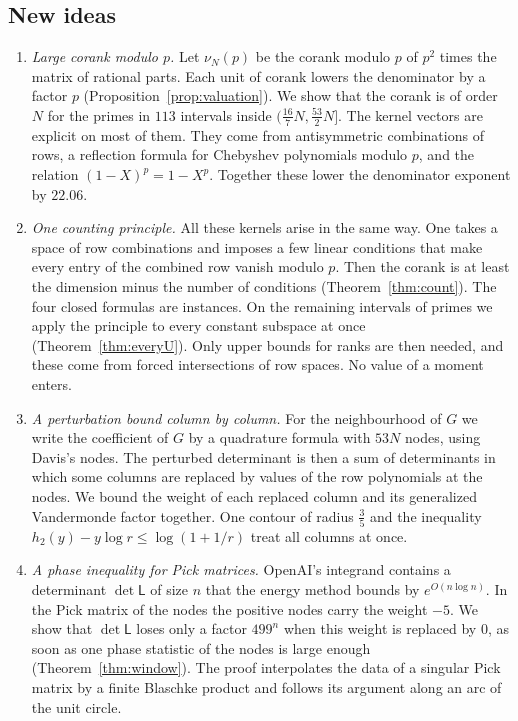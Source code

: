 \documentclass[11pt]{amsart}
\theoremstyle{definition}
\theoremstyle{remark}
\numberwithin{equation}{section}
\begin{document}
\subsection{New ideas}\label{sec:intro-ideas}
\begin{enumerate}[label=\arabic*.,wide]
\item \emph{Large corank modulo $p$.} Let $\nu_N(p)$ be the corank modulo $p$ of $p^2$ times the matrix of
rational parts. Each unit of corank lowers the denominator by a factor $p$
(Proposition~\ref{prop:valuation}). We show that the corank is of order $N$ for the primes in
$113$ intervals inside $(\frac{16}7N,\frac{53}2N]$. The kernel vectors are explicit on most of them. They come from
antisymmetric combinations of rows, a reflection formula for Chebyshev polynomials modulo $p$, and the
relation $(1-X)^p=1-X^p$. Together these lower the denominator exponent by $22.06$.

\item \emph{One counting principle.} All these kernels arise in the same way. One takes a space of row
combinations and imposes a few linear conditions that make every entry of the combined row vanish modulo
$p$. Then the corank is at least the dimension minus the number of conditions (Theorem~\ref{thm:count}).
The four closed formulas are instances. On the remaining intervals of primes we apply the principle to
every constant subspace at once (Theorem~\ref{thm:everyU}). Only upper bounds for ranks are then needed,
and these come from forced intersections of row spaces. No value of a moment enters.

\item \emph{A perturbation bound column by column.} For the neighbourhood of $G$ we write the coefficient of
$G$ by a quadrature formula with $53N$ nodes, using Davis's nodes. The perturbed determinant is then a sum of
determinants in which some columns are replaced by values of the row polynomials at the nodes. We bound the
weight of each replaced column and its generalized Vandermonde factor together. One contour of radius
$\frac35$ and the inequality $h_2(y)-y\log r\le\log(1+1/r)$ treat all columns at once.

\item \emph{A phase inequality for Pick matrices.} OpenAI's integrand contains a determinant
$\det\mathsf L$ of size $n$ that the energy method bounds by $e^{O(n\log n)}$. In the Pick matrix of the nodes the
positive nodes carry the weight $-5$. We show that $\det\mathsf L$ loses only a factor $499^n$ when this
weight is replaced by $0$, as soon as one phase statistic of the nodes is large enough
(Theorem~\ref{thm:window}). The proof interpolates the data of a singular Pick matrix by a finite Blaschke
product and follows its argument along an arc of the unit circle.


\end{enumerate}
\end{document}
